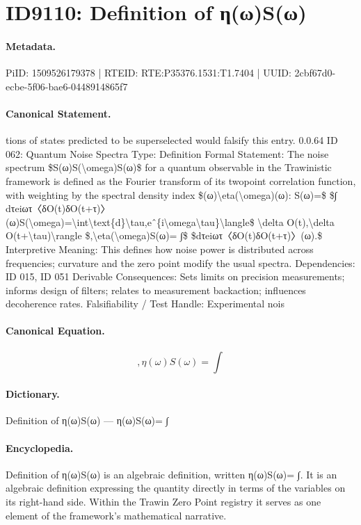 \section*{ID9110: Definition of η(ω)S(ω)}
\paragraph{Metadata.}
PiID: 1509526179378 | RTEID: RTE:P35376.1531:T1.7404 | UUID: 2cbf67d0-ecbe-5f06-bae6-0448914865f7

\paragraph{Canonical Statement.}
tions of states predicted to be superselected would falsify this entry. 0.0.64 ID 062: Quantum Noise Spectra Type: Definition Formal Statement: The noise spectrum \$S(ω)S(\textbackslash{}omega)S(ω)\$ for a quantum observable in the Trawinistic framework is defined as the Fourier transform of its twopoint correlation function, with weighting by the spectral density index \$(ω)\textbackslash{}eta(\textbackslash{}omega)(ω): S(ω)=\$ \$∫ dτeiωτ〈δO(t)δO(t+τ)〉(ω)S(\textbackslash{}omega)=\textbackslash{}int\textbackslash{}text\{d\}\textbackslash{}tau,eˆ\{i\textbackslash{}omega\textbackslash{}tau\}\textbackslash{}langle\$ \textbackslash{}delta O(t),\textbackslash{}delta O(t+\textbackslash{}tau)\textbackslash{}rangle \$,\textbackslash{}eta(\textbackslash{}omega)S(ω)= ∫\$ \$dτeiωτ〈δO(t)δO(t+τ)〉(ω).\$ Interpretive Meaning: This defines how noise power is distributed across frequencies; curvature and the zero point modify the usual spectra. Dependencies: ID 015, ID 051 Derivable Consequences: Sets limits on precision measurements; informs design of filters; relates to measurement backaction; influences decoherence rates. Falsifiability / Test Handle: Experimental nois

\paragraph{Canonical Equation.}
\[
,\eta(\omega)S(ω)= ∫
\]

\paragraph{Dictionary.}
Definition of η(ω)S(ω) — η(ω)S(ω)= ∫

\paragraph{Encyclopedia.}
Definition of η(ω)S(ω) is an algebraic definition, written η(ω)S(ω)= ∫. It is an algebraic definition expressing the quantity directly in terms of the variables on its right-hand side. Within the Trawin Zero Point registry it serves as one element of the framework's mathematical narrative.
